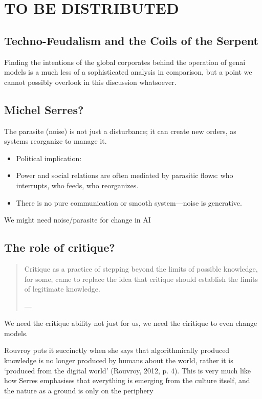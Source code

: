 \chapter{TO BE DISTRIBUTED}



\section{Techno-Feudalism and the Coils of the Serpent}
Finding the intentions of the global corporates behind the operation of \gls{genai} models is a much less of a sophisticated analysis in comparison, but a point
we cannot possibly overlook in this discussion whatsoever.


\section{Michel Serres?}


The parasite (noise) is not just a disturbance; it can create new orders, as systems reorganize to manage it.
\begin{itemize}
	\item Political implication:
	\item Power and social relations are often mediated by parasitic flows: who interrupts, who feeds, who reorganizes.
	\item There is no pure communication or smooth system—noise is generative.

\end{itemize}

We might need noise/parasite for change in AI

\section{The role of critique?}

\begin{quote}
	Critique as a practice of stepping beyond the limits of possible  knowledge, for some, came to replace the idea that critique should establish the  limits of legitimate knowledge.

	— \cite[17]{mackenzie2021}
\end{quote}

We need the critique ability not just for us, we need the ciritique to even
change models.

Rouvroy puts it succinctly when she says that  algorithmically produced knowledge is no longer produced by humans about the world, rather it is ‘produced from the digital world’ (Rouvroy, 2012, p. 4). This is very much like how Serres emphasises that everything is emerging from the culture itself, and the nature as a ground is only on the periphery
